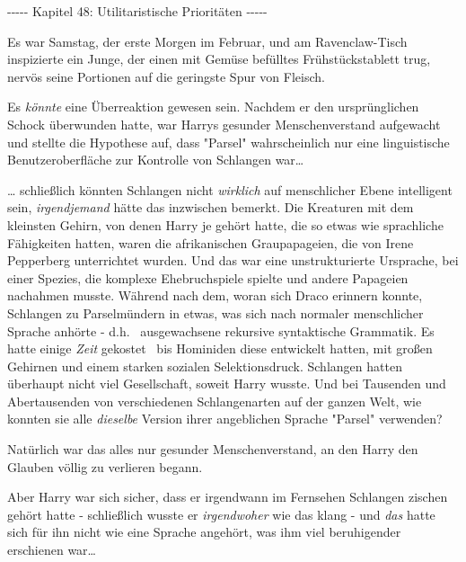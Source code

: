 

\hypertarget{utilitaristische-priorituxe4ten}{%

-\/-\/-\/-\/- Kapitel 48: Utilitaristische Prioritäten -\/-\/-\/-\/-

Es war Samstag, der erste Morgen im Februar, und am Ravenclaw-Tisch inspizierte ein Junge, der einen mit Gemüse befülltes Frühstückstablett trug, nervös seine Portionen auf die geringste Spur von Fleisch.

Es \emph{könnte} eine Überreaktion gewesen sein. Nachdem er den ursprünglichen Schock überwunden hatte, war Harrys gesunder Menschenverstand aufgewacht und stellte die Hypothese auf, dass "Parsel" wahrscheinlich nur eine linguistische Benutzeroberfläche zur Kontrolle von Schlangen war…

… schließlich könnten Schlangen nicht \emph{wirklich} auf menschlicher Ebene intelligent sein, \emph{irgendjemand} hätte das inzwischen bemerkt. Die Kreaturen mit dem kleinsten Gehirn, von denen Harry je gehört hatte, die so etwas wie sprachliche Fähigkeiten hatten, waren die afrikanischen Graupapageien, die von Irene Pepperberg unterrichtet wurden. Und das war eine unstrukturierte Ursprache, bei einer Spezies, die komplexe Ehebruchspiele spielte und andere Papageien nachahmen musste. Während nach dem, woran sich Draco erinnern konnte, Schlangen zu Parselmündern in etwas, was sich nach normaler menschlicher Sprache anhörte - d.h. ~ausgewachsene rekursive syntaktische Grammatik. Es hatte einige \emph{Zeit} gekostet ~bis Hominiden diese entwickelt hatten, mit großen Gehirnen und einem starken sozialen Selektionsdruck. Schlangen hatten überhaupt nicht viel Gesellschaft, soweit Harry wusste. Und bei Tausenden und Abertausenden von verschiedenen Schlangenarten auf der ganzen Welt, wie konnten sie alle \emph{dieselbe} Version ihrer angeblichen Sprache "Parsel" verwenden?

Natürlich war das alles nur gesunder Menschenverstand, an den Harry den Glauben völlig zu verlieren begann.

Aber Harry war sich sicher, dass er irgendwann im Fernsehen Schlangen zischen gehört hatte - schließlich wusste er \emph{irgendwoher} wie das klang - und \emph{das} hatte sich für ihn nicht wie eine Sprache angehört, was ihm viel beruhigender erschienen war…

}
